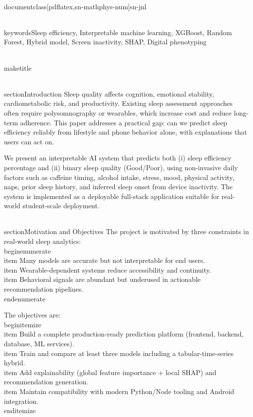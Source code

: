 \\documentclass[pdflatex,sn-mathphys-num]{sn-jnl}
\begin{document}
\\keywords{Sleep efficiency, Interpretable machine learning, XGBoost, Random Forest, Hybrid model, Screen inactivity, SHAP, Digital phenotyping}

\\maketitle

\\section{Introduction}
Sleep quality affects cognition, emotional stability, cardiometabolic risk, and productivity. Existing sleep assessment approaches often require polysomnography or wearables, which increase cost and reduce long-term adherence. This paper addresses a practical gap: can we predict sleep efficiency reliably from lifestyle and phone behavior alone, with explanations that users can act on.

We present an interpretable AI system that predicts both (i) sleep efficiency percentage and (ii) binary sleep quality (Good/Poor), using non-invasive daily factors such as caffeine timing, alcohol intake, stress, mood, physical activity, naps, prior sleep history, and inferred sleep onset from device inactivity. The system is implemented as a deployable full-stack application suitable for real-world student-scale deployment.

\\section{Motivation and Objectives}
The project is motivated by three constraints in real-world sleep analytics:
\\begin{enumerate}
    \\item Many models are accurate but not interpretable for end users.
    \\item Wearable-dependent systems reduce accessibility and continuity.
    \\item Behavioral signals are abundant but underused in actionable recommendation pipelines.
\\end{enumerate}

The objectives are:
\\begin{itemize}
    \\item Build a complete production-ready prediction platform (frontend, backend, database, ML services).
    \\item Train and compare at least three models including a tabular-time-series hybrid.
    \\item Add explainability (global feature importance + local SHAP) and recommendation generation.
    \\item Maintain compatibility with modern Python/Node tooling and Android integration.
\\end{itemize}
\end{document}
